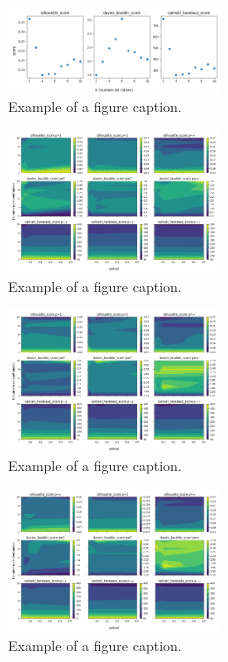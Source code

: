 \begin{figure}[htbp]
\centerline{\includegraphics[width=0.5\textwidth]{graficos_experimentos/gmm/caracteristicos4_pca0.99.png}}
\caption{Example of a figure caption.}
\label{graficos_experimentos/gmm/caracteristicos4_pca0.99.png}
\end{figure}
 
\begin{figure}[htbp]
\centerline{\includegraphics[width=0.5\textwidth]{graficos_experimentos/k_medias/caracteristicos0_pca0.9.png}}
\caption{Example of a figure caption.}
\label{graficos_experimentos/k_medias/caracteristicos0_pca0.9.png}
\end{figure}
 
\begin{figure}[htbp]
\centerline{\includegraphics[width=0.5\textwidth]{graficos_experimentos/k_medias/caracteristicos0_pca0.95.png}}
\caption{Example of a figure caption.}
\label{graficos_experimentos/k_medias/caracteristicos0_pca0.95.png}
\end{figure}
 
\begin{figure}[htbp]
\centerline{\includegraphics[width=0.5\textwidth]{graficos_experimentos/k_medias/caracteristicos0_pca0.99.png}}
\caption{Example of a figure caption.}
\label{graficos_experimentos/k_medias/caracteristicos0_pca0.99.png}
\end{figure}
 
